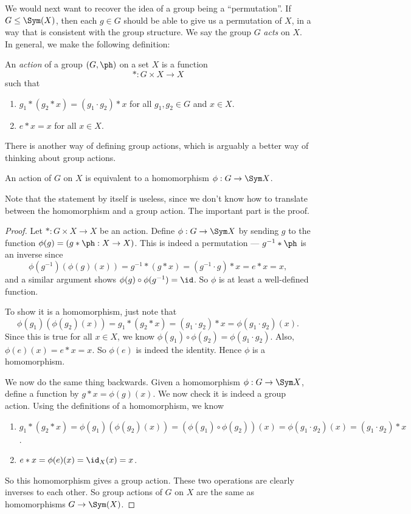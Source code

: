 \documentclass[a4paper]{article}
\begin{document}
We would next want to recover the idea of a group being a ``permutation''. If $G \leq \Sym(X)$, then each $g \in G$ should be able to give us a permutation of $X$, in a way that is consistent with the group structure. We say the group $G$ \emph{acts} on $X$. In general, we make the following definition:

\begin{defi}
  An \emph{action} of a group $(G, \ph)$ on a set $X$ is a function
  \[
    *: G\times X \to X
  \]
  such that
  \begin{enumerate}
    \item $g_1 * (g_2 * x) = (g_1 \cdot g_2) * x$ for all $g_1, g_2 \in G$ and $x \in X$.
    \item $e * x = x$ for all $x \in X$.
  \end{enumerate}
\end{defi}
There is another way of defining group actions, which is arguably a better way of thinking about group actions.

\begin{lemma}
  An action of $G$ on $X$ is equivalent to a homomorphism $\phi: G \to \Sym X$.
\end{lemma}
Note that the statement by itself is useless, since we don't know how to translate between the homomorphism and a group action. The important part is the proof.
\begin{proof}
  Let $*: G \times X \to X$ be an action. Define $\phi: G \to \Sym X$ by sending $g$ to the function $\phi(g) = (g * \ph : X \to X)$. This is indeed a permutation --- $g^{-1} * \ph$ is an inverse since
  \[
    \phi(g^{-1})(\phi(g)(x)) = g^{-1} * (g * x) = (g^{-1} \cdot g) * x = e * x = x,
  \]
  and a similar argument shows $\phi(g) \circ \phi(g^{-1}) = \id$. So $\phi$ is at least a well-defined function.

  To show it is a homomorphism, just note that
  \[
    \phi(g_1)(\phi(g_2)(x)) = g_1 * (g_2 * x) = (g_1 \cdot g_2) * x = \phi(g_1 \cdot g_2)(x).
  \]
  Since this is true for all $x \in X$, we know $\phi(g_1)\circ \phi(g_2) = \phi(g_1 \cdot g_2)$. Also, $\phi(e)(x) = e * x = x$. So $\phi(e)$ is indeed the identity. Hence $\phi$ is a homomorphism.

  We now do the same thing backwards. Given a homomorphism $\phi: G \to \Sym X$, define a function by $g * x = \phi(g)(x)$. We now check it is indeed a group action. Using the definitions of a homomorphism, we know
  \begin{enumerate}
    \item $g_1 * (g_2 * x) = \phi(g_1)(\phi(g_2)(x)) = (\phi(g_1) \circ \phi(g_2))(x) = \phi(g_1 \cdot g_2)(x) = (g_1 \cdot g_2) * x$.
    \item $e * x = \phi(e)(x) = \id_X(x) = x$.
  \end{enumerate}
  So this homomorphism gives a group action. These two operations are clearly inverses to each other. So group actions of $G$ on $X$ are the same as homomorphisms $G \to \Sym(X)$.
\end{proof}
\end{document}

